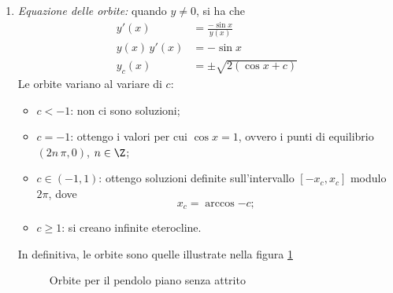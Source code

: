 {\begin{enumerate}
        $\implies$ $ x = k\, \pi $, $ k \in \Z $. 
        \begin{figure}
            \begin{center}
            \end{center}
            \caption{Punti di equilibrio e a tangente orizzontale/verticale per il pendolo senza attrito}
        \end{figure}
        \item \emph{Equazione delle orbite:} quando $ y\neq 0 $, si ha che \begin{align*}
            y'(x) &= \frac{-\sin x}{y(x)}\\ 
            y(x)\,y'(x) &= -\sin x\\ 
            y_{c}(x) &= \pm \sqrt{2\left(\cos x + c\right)} 
        \end{align*}Le orbite variano al variare di $ c $: \begin{itemize}
            \item $ c<-1 $: non ci sono soluzioni;
            \item $ c=-1 $: ottengo i valori per cui $ \cos x = 1 $, ovvero i punti di equilibrio $ (2n\,\pi, 0) $, $ n \in \Z $;
            \item $ c \in (-1,1) $: ottengo soluzioni definite sull'intervallo $ [-x_{c}, x_{c}  ] $ modulo $ 2\pi $, dove \[
                x_{c}=\arccos{-c};
            \]
            \item $ c\ge1 $: si creano infinite eterocline. 
        \end{itemize}
        In definitiva, le orbite sono quelle illustrate nella figura \ref{fig:sodaufnaisdufjaiuhfaoisfjdaosi}
        \begin{figure}
            \begin{center}
                
            \end{center}
            \caption{Orbite per il pendolo piano senza attrito}\label{fig:sodaufnaisdufjaiuhfaoisfjdaosi}
        \end{figure}


\end{enumerate}}
